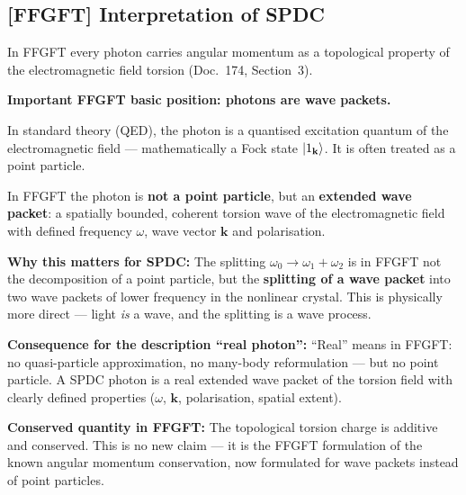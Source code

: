 \subsection{[FFGFT] Interpretation of SPDC}

\begin{foundation}
In FFGFT every photon carries angular momentum as a
topological property of the electromagnetic field torsion
(Doc.~174, Section~3).

\textbf{Important FFGFT basic position: photons are wave packets.}

In standard theory (QED), the photon is a quantised
excitation quantum of the electromagnetic field --- mathematically
a Fock state $\left|1_\mathbf{k}\right\rangle$.
It is often treated as a point particle.

In FFGFT the photon is \textbf{not a point particle},
but an \textbf{extended wave packet}:
a spatially bounded, coherent torsion wave of the
electromagnetic field with defined frequency $\omega$,
wave vector $\mathbf{k}$ and polarisation.

\textbf{Why this matters for SPDC:}
The splitting $\omega_0 \to \omega_1 + \omega_2$ is
in FFGFT not the decomposition of a point particle,
but the \textbf{splitting of a wave packet}
into two wave packets of lower frequency in the nonlinear crystal.
This is physically more direct --- light \emph{is} a wave,
and the splitting is a wave process.

\begin{center}
\end{center}

\textbf{Consequence for the description ``real photon'':}
``Real'' means in FFGFT: no quasi-particle approximation,
no many-body reformulation --- but no point particle.
A SPDC photon is a real extended wave packet
of the torsion field with clearly defined properties
($\omega$, $\mathbf{k}$, polarisation, spatial extent).

\textbf{Conserved quantity in FFGFT:}
The topological torsion charge is additive and conserved.
This is no new claim --- it is the FFGFT formulation
of the known angular momentum conservation, now formulated
for wave packets instead of point particles.
\end{foundation}

